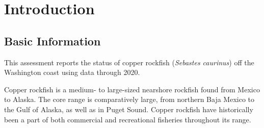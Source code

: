 \documentclass[11pt,
  english,
  a4paper,
]{article}
\begin{document}
\newcommand{\lt}{\ensuremath <}
\newcommand{\gt}{\ensuremath >}

\setcounter{page}{1}

\renewcommand{\thetable}{\roman{table}}
\renewcommand{\thefigure}{\roman{figure}}

\setlength\parskip{0.5em plus 0.1em minus 0.2em}

\vspace{500cm}

\pagebreak

\pagebreak
\setlength{\parskip}{5mm plus1mm minus1mm}
\setcounter{page}{1}
\renewcommand{\thefigure}{\arabic{figure}}
\renewcommand{\thetable}{\arabic{table}}
\setcounter{table}{0}
\setcounter{figure}{0}

\setlength\parskip{0.5em plus 0.1em minus 0.2em}


\hypertarget{introduction}{%
\section{Introduction}\label{introduction}}

\leavevmode\tagmcend\tagstructend


\hypertarget{basic-information}{%
\subsection{Basic Information}\label{basic-information}}

\leavevmode\tagmcend\tagstructend


This assessment reports the status of copper rockfish (\emph{Sebastes caurinus}) off the Washington coast using data through 2020.

\leavevmode\tagmcend\tagstructend\par


Copper rockfish is a medium- to large-sized nearshore rockfish found from Mexico to Alaska. The core range is comparatively large, from northern Baja Mexico to the Gulf of Alaska, as well as in Puget Sound. Copper rockfish have historically been a part of both commercial and recreational fisheries throughout its range.
\end{document}
